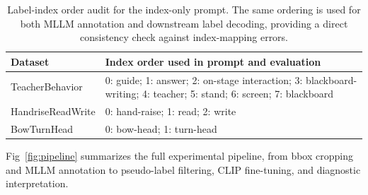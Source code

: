 \documentclass[10pt,letterpaper]{article}
\begin{document}
\begin{table}[H]
\caption{Label-index order audit for the index-only prompt. The same
ordering is used for both MLLM annotation and downstream label decoding,
providing a direct consistency check against index-mapping errors.}
\label{tab:index_mapping_audit}
\centering
\begin{tabular}{lp{10.6cm}}
\toprule
\textbf{Dataset} & \textbf{Index order used in prompt and evaluation} \\
\midrule
TeacherBehavior & 0: guide; 1: answer; 2: on-stage interaction; 3: blackboard-writing; 4: teacher; 5: stand; 6: screen; 7: blackboard \\
HandriseReadWrite & 0: hand-raise; 1: read; 2: write \\
BowTurnHead & 0: bow-head; 1: turn-head \\
\bottomrule
\end{tabular}
\end{table}

Fig~\ref{fig:pipeline} summarizes the full experimental pipeline,
from bbox cropping and MLLM annotation to pseudo-label filtering,
CLIP fine-tuning, and diagnostic interpretation.
\end{document}
